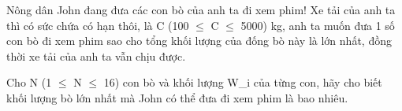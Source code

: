 Nông dân John đang đưa các con bò của anh ta đi xem phim! Xe tải của  anh ta thì có sức chứa có hạn thôi, là C (100  $\le$  C  $\le$  5000) kg, anh  ta muốn đưa 1 số con bò đi xem phim sao cho tổng khối lượng của đống  bò này là lớn nhất, đồng thời xe tải của anh ta vẫn chịu được.  

   Cho N (1  $\le$  N  $\le$  16) con bò và khối lượng W\_i của từng con, hãy cho  biết khối lượng bò lớn nhất mà John có thể đưa đi xem phim  là bao nhiêu.